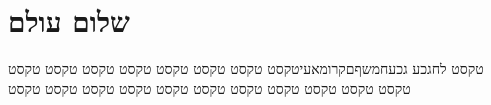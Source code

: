 \documentclass[twoside, openany, parskip=half, 11pt]{book}
\begin{document}
    \chapter{שלום עולם}

     טקסט לחגכע גכעחמשףםקרומאעיטקסט טקסט טקסט טקסט טקסט טקסט טקסט טקסט טקסט טקסט טקסט טקסט טקסט טקסט טקסט טקסט טקסט טקסט טקסט

     
     \adonolam
\end{document}
